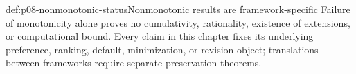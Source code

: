 \begin{hbwarning}{def:p08-nonmonotonic-status}{Nonmonotonic results are framework-specific}
Failure of monotonicity alone proves no cumulativity, rationality, existence of
extensions, or computational bound. Every claim in this chapter fixes its
underlying preference, ranking, default, minimization, or revision object;
translations between frameworks require separate preservation
theorems.
\end{hbwarning}
